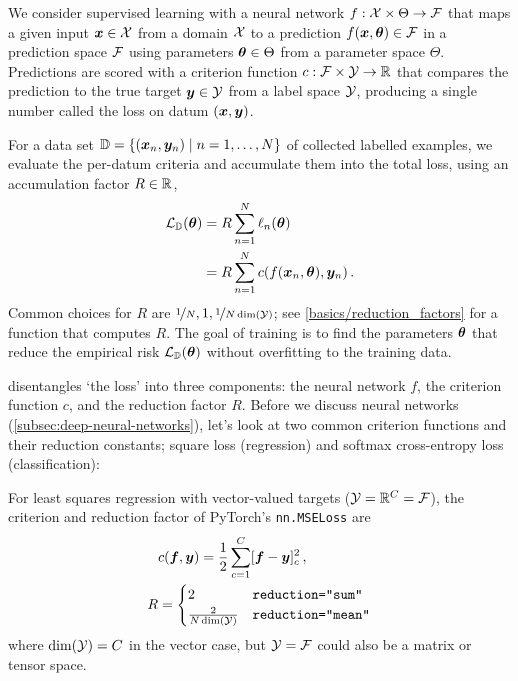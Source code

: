 We consider supervised learning with a neural network $f: {\mathcal{X}} \times \Theta \to {\mathcal{F}}$ that maps a given input ${\bm{x}} \in {\mathcal{X}}$ from a domain ${\mathcal{X}}$ to a prediction $f({\bm{x}}, {\bm{\theta}}) \in {\mathcal{F}}$ in a prediction space ${\mathcal{F}}$ using parameters ${\bm{\theta}} \in \Theta$ from a parameter space $\Theta$.
Predictions are scored with a criterion function $c: {\mathcal{F}} \times {\mathcal{Y}} \to {\mathbb{R}}$ that compares the prediction to the true target ${\bm{y}} \in {\mathcal{Y}}$ from a label space ${\mathcal{Y}}$, producing a single number called the loss on datum $({\bm{x}}, {\bm{y}})$.

For a data set ${\mathbb{D}} = \{({\bm{x}}_n, {\bm{y}}_n) \mid n=1, \dots, N\}$ of collected labelled examples, we evaluate the per-datum criteria and accumulate them into the total loss, using an accumulation factor $R \in {\mathbb{R}}$,
\begin{align}\label{eq:empirical_risk}
  \begin{split}
    {\mathcal{L}}_{{\mathbb{D}}}({\bm{\theta}}) & = R \sum_{n=1}^N \ell_n({\bm{\theta}})
    \\
                       & = R \sum_{n=1}^N c(f({\bm{x}}_n, {\bm{\theta}}), {\bm{y}}_n)\,.
  \end{split}
\end{align}
Common choices for $R$ are $\nicefrac{1}{N}, 1, \nicefrac{1}{N \dim({\mathcal{Y}})}$; see \cref{basics/reduction_factors} for a function that computes $R$.
The goal of training is to find the parameters ${\bm{\theta}}$ that reduce the empirical risk ${\mathcal{L}}_{{\mathbb{D}}}({\bm{\theta}})$ without overfitting to the training data.

 disentangles `the loss' into three components: the neural network $f$, the criterion function $c$, and the reduction factor $R$.
Before we discuss neural networks (\cref{subsec:deep-neural-networks}), let's look at two common criterion functions and their reduction constants; square loss (regression) and softmax cross-entropy loss (classification):

\begin{example}\label{ex:square_loss}
  For least squares regression with vector-valued targets (${\mathcal{Y}} = {\mathbb{R}}^C = {\mathcal{F}}$), the criterion and reduction factor of PyTorch's \texttt{nn.MSELoss} are
  \begin{align*}
    &c({\bm{f}}, {\bm{y}})
      =
      \frac{1}{2}\sum_{c=1}^C [{\bm{f}} - {\bm{y}}]_c^2\,,
    \\
    R
    &=
      \begin{cases}
        2                     & \text{\texttt{reduction="sum"}}
        \\
        \frac{2}{N \dim({\mathcal{Y}})} & \text{\texttt{reduction="mean"}}
      \end{cases}
  \end{align*}
  where $\dim({\mathcal{Y}}) = C$ in the vector case, but ${\mathcal{Y}} = {\mathcal{F}}$ could also be a matrix or tensor space.
\end{example}

